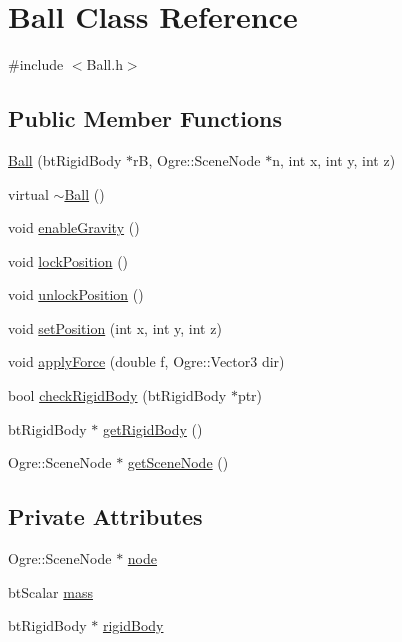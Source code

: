 \hypertarget{classBall}{\section{Ball Class Reference}
\label{classBall}
}


{\ttfamily \#include $<$Ball.\-h$>$}

\subsection*{Public Member Functions}
\begin{DoxyCompactItemize}
\item 
\hyperlink{classBall_aec238435b8abb83b6459dc811be703b9}{Ball} (bt\-Rigid\-Body $\ast$r\-B, Ogre\-::\-Scene\-Node $\ast$n, int x, int y, int z)
\item 
virtual \hyperlink{classBall_a20f2f6ac0bf648f406a8e12e63429fcd}{$\sim$\-Ball} ()
\item 
void \hyperlink{classBall_acc744032fcdb54f6555880296b899a1e}{enable\-Gravity} ()
\item 
void \hyperlink{classBall_aca417b802b8bd765d6a06adc64b4cd1c}{lock\-Position} ()
\item 
void \hyperlink{classBall_ab4ad64bcaa75353124023b924de9ff98}{unlock\-Position} ()
\item 
void \hyperlink{classBall_afe626f0cd58bb4e6e604f18be11ae6ca}{set\-Position} (int x, int y, int z)
\item 
void \hyperlink{classBall_a902a1e615fa1c0f9b91c700a90f4f475}{apply\-Force} (double f, Ogre\-::\-Vector3 dir)
\item 
bool \hyperlink{classBall_a6364b72dcbf707a3ff649fdf731936d4}{check\-Rigid\-Body} (bt\-Rigid\-Body $\ast$ptr)
\item 
bt\-Rigid\-Body $\ast$ \hyperlink{classBall_a0dde8c947575a2f2edb671ef02326c50}{get\-Rigid\-Body} ()
\item 
Ogre\-::\-Scene\-Node $\ast$ \hyperlink{classBall_a80897cd66327c7b8664b5416021c9f12}{get\-Scene\-Node} ()
\end{DoxyCompactItemize}
\subsection*{Private Attributes}
\begin{DoxyCompactItemize}
\item 
Ogre\-::\-Scene\-Node $\ast$ \hyperlink{classBall_af1e78462805ffd11789b6e6d3940068f}{node}
\item 
bt\-Scalar \hyperlink{classBall_aee2035d202321b658c0869f1e885766b}{mass}
\item 
bt\-Rigid\-Body $\ast$ \hyperlink{classBall_aa692f8be903d336bb9908482c464ff4b}{rigid\-Body}
\end{DoxyCompactItemize}


